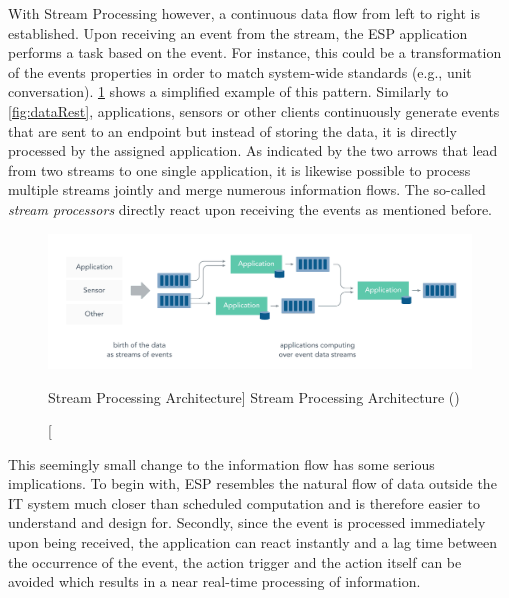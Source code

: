 With Stream Processing however, a continuous data flow from left to right is established. Upon receiving an event from the stream, the \acf{ESP} application performs a task based on the event. For instance, this could be a transformation of the events properties in order to match system-wide standards (e.g., unit conversation). 
\ref{fig:dataStream} shows a simplified example of this pattern. Similarly to \ref{fig:dataRest}, applications, sensors or other clients continuously generate events that are sent to an endpoint but instead of storing the data, it is directly processed by the assigned application. As indicated by the two arrows that lead from two streams to one single application, it is likewise possible to process multiple streams jointly and merge numerous information flows. The so-called \textit{stream processors} directly react upon receiving the events as mentioned before. 

\begin{figure}[ht]
    \includegraphics[width=\linewidth]{images/streaming/streming_data.png}\centering
    \caption
    [Stream Processing Architecture]
    {Stream Processing Architecture (\cite{dataArtisans2017WhatProcessing})}
    \label{fig:dataStream}
\end{figure}

This seemingly small change to the information flow has some serious implications. To begin with, \acf{ESP} resembles the natural flow of data outside the IT system much closer than scheduled computation and is therefore easier to understand and design for. Secondly, since the event is processed immediately upon being received, the application can react instantly and a lag time between the occurrence of the event, the action trigger and the action itself can be avoided which results in a near real-time processing of information. 

